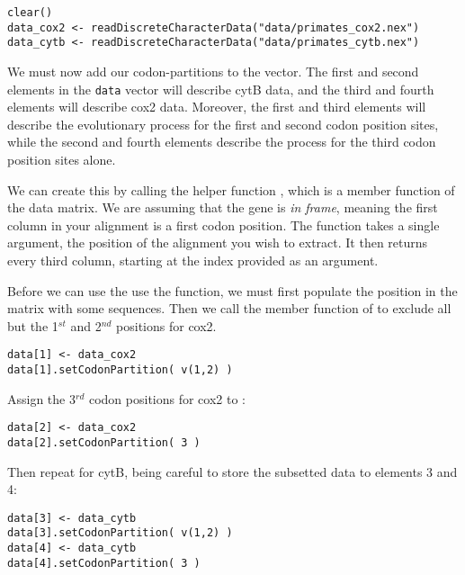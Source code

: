 {\tt \begin{snugshade*}
\begin{lstlisting}
clear()
data_cox2 <- readDiscreteCharacterData("data/primates_cox2.nex")
data_cytb <- readDiscreteCharacterData("data/primates_cytb.nex")
\end{lstlisting}
\end{snugshade*}}

We must now add our codon-partitions to the  vector.
The first and second elements in the {\tt data} vector will describe cytB data, and the third and fourth elements will describe cox2 data.
Moreover, the first and third elements will describe the evolutionary process for the first and second codon position sites, while the second and fourth elements describe the process for the third codon position sites alone.

We can create this by calling the helper function , which is a member function of the data matrix. 
We are assuming that the gene is \textit{in frame}, meaning the first column in your alignment is a first codon position. 
The  function takes a single argument, the position of the alignment you wish to extract. 
It then returns every third column, starting at the index provided as an argument.

Before we can use the use the  function, we must first populate the position in the  matrix with some sequences. 
Then we call the member function of  to exclude all but the 1$^{st}$ and 2$^{nd}$ positions for cox2.
{\tt \begin{snugshade*}
\begin{lstlisting}
data[1] <- data_cox2
data[1].setCodonPartition( v(1,2) )
\end{lstlisting}
\end{snugshade*}}

Assign the 3$^{rd}$ codon positions for cox2 to :
{\tt \begin{snugshade*}
\begin{lstlisting}
data[2] <- data_cox2
data[2].setCodonPartition( 3 )
\end{lstlisting}
\end{snugshade*}}

Then repeat for cytB, being careful to store the subsetted data to elements 3 and 4:
{\tt \begin{snugshade*}
\begin{lstlisting}
data[3] <- data_cytb
data[3].setCodonPartition( v(1,2) )
data[4] <- data_cytb
data[4].setCodonPartition( 3 )
\end{lstlisting}
\end{snugshade*}}

